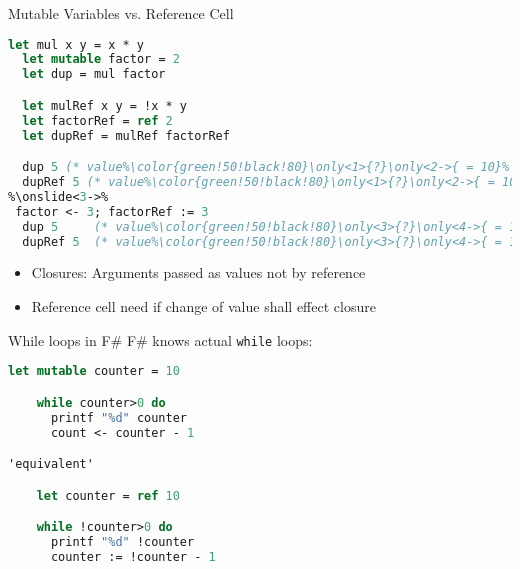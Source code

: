 \documentclass{beamer}
\begin{document}
\begin{frame}[fragile]{Mutable Variables vs. Reference Cell}

\begin{lstlisting}[language=FSharp, escapechar=\%]
  let mul x y = x * y
  let mutable factor = 2
  let dup = mul factor

  let mulRef x y = !x * y
  let factorRef = ref 2
  let dupRef = mulRef factorRef

  dup 5 (* value%\color{green!50!black!80}\only<1>{?}\only<2->{ = 10}% *)
  dupRef 5 (* value%\color{green!50!black!80}\only<1>{?}\only<2->{ = 10}% *)
%\onslide<3->% 
 factor <- 3; factorRef := 3
  dup 5     (* value%\color{green!50!black!80}\only<3>{?}\only<4->{ = 10}% *)
  dupRef 5  (* value%\color{green!50!black!80}\only<3>{?}\only<4->{ = 15}% *)
\end{lstlisting}


\begin{itemize}
\item<4-> Closures: Arguments passed as values not by reference
\item<4-> Reference cell need if change of value shall effect closure
\end{itemize}
\end{frame}

\begin{frame}[fragile]{While loops in F\#}
  F\# knows actual \lstinline!while! loops:

\begin{lstlisting}[language=FSharp, escapechar=\']
    let mutable counter = 10 

    while counter>0 do
      printf "%d" counter
      count <- counter - 1

'equivalent'

    let counter = ref 10 

    while !counter>0 do
      printf "%d" !counter
      counter := !counter - 1
\end{lstlisting}

\end{frame}
\end{document}
